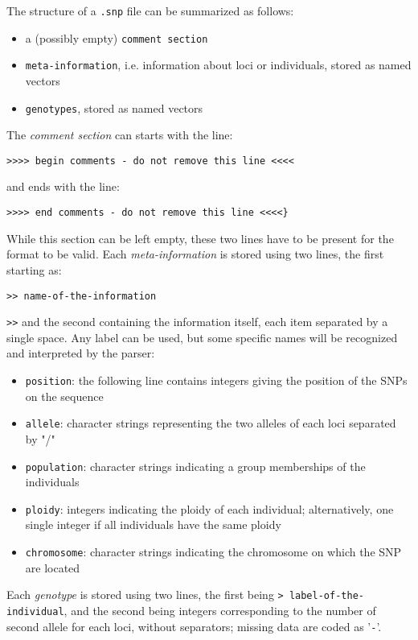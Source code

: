 \documentclass{article}
\begin{document}
The structure of a \texttt{.snp} file can be summarized as follows:
\begin{itemize}
\item a (possibly empty) \texttt{comment section}
\item \texttt{meta-information}, i.e. information about loci or individuals, stored as named vectors
\item \texttt{genotypes}, stored as named vectors
\end{itemize}

The \textit{comment section} can starts with the line:\\
\begin{verbatim}
>>>> begin comments - do not remove this line <<<<
\end{verbatim}
\noindent and ends with the line:\\
\begin{verbatim}
>>>> end comments - do not remove this line <<<<}
\end{verbatim}
\noindent While this section can be left empty, these two lines have to be present for the format to
be valid.
Each \textit{meta-information} is stored using two lines, the first starting as:
\begin{verbatim}
>> name-of-the-information
\end{verbatim}
\texttt{>}\texttt{>}
and the second containing the information itself, each item separated by a single space.
Any label can be used, but some specific names will be recognized and interpreted by the parser:
\begin{itemize}
\item \texttt{position}: the following line contains integers giving the position of the SNPs on the sequence
\item \texttt{allele}: character strings representing the two alleles of each loci separated by "/"
\item \texttt{population}: character strings indicating a group memberships of the individuals
\item \texttt{ploidy}: integers indicating the ploidy of each individual; alternatively, one single integer if
all individuals have the same ploidy
\item \texttt{chromosome}: character strings indicating the chromosome on which the SNP are located
\end{itemize}
Each \textit{genotype} is stored using two lines, the first being
\texttt{> label-of-the-individual}, and the second being integers corresponding to the number of
second allele for each loci, without separators; missing data are coded as '\texttt{-}'.
\\
\end{document}
